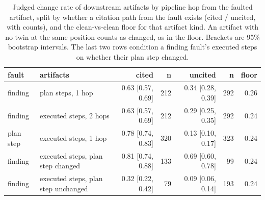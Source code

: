 \begin{table}[t]
\centering
\small
\begin{tabular}{llrrrrr}
\toprule
fault & artifacts & cited & n & uncited & n  & floor \\
\midrule
finding & plan steps, 1 hop & 0.63 [0.57, 0.69] & 212 & 0.34 [0.28, 0.39] & 292 & 0.26 \\
finding & executed steps, 2 hops & 0.63 [0.57, 0.69] & 212 & 0.29 [0.25, 0.35] & 292 & 0.24 \\
plan step & executed steps, 1 hop & 0.78 [0.74, 0.83] & 320 & 0.13 [0.10, 0.17] & 323 & 0.24 \\
finding & executed steps, plan step changed & 0.81 [0.74, 0.88] & 133 & 0.69 [0.60, 0.78] & 99 & 0.24 \\
finding & executed steps, plan step unchanged & 0.32 [0.22, 0.42] & 79 & 0.09 [0.06, 0.14] & 193 & 0.24 \\
\bottomrule
\end{tabular}
\caption{Judged change rate of downstream artifacts by pipeline hop from the faulted artifact, split by whether a citation path from the fault exists (cited / uncited, with counts), and the clean-vs-clean floor for that artifact kind. An artifact with no twin at the same position counts as changed, as in the floor. Brackets are 95\% bootstrap intervals. The last two rows condition a finding fault's executed steps on whether their plan step changed.}
\label{tab:distance}
\end{table}
